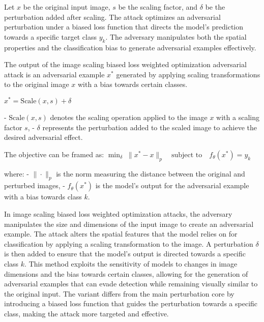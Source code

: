 Let \( x \) be the original input image, \( s \) be the scaling factor, and \( \delta \) be the perturbation added after scaling. The attack optimizes an adversarial perturbation under a biased loss function that directs the model's prediction towards a specific target class \( y_k \). The adversary manipulates both the spatial properties and the classification bias to generate adversarial examples effectively.

The output of the image scaling biased loss weighted optimization adversarial attack is an adversarial example $x^*$ generated by applying scaling transformations to the original image $x$ with a bias towards certain classes.

$x^* = \text{Scale}(x, s) + \delta$

- $\text{Scale}(x, s)$ denotes the scaling operation applied to the image $x$ with a scaling factor $s$,
- $\delta$ represents the perturbation added to the scaled image to achieve the desired adversarial effect.

The objective can be framed as:
$\min_{\delta} \; \|x^* - x\|_p \quad \text{subject to} \quad f_\theta(x^*) = y_k$

where:
- $\|\cdot\|_p$ is the norm measuring the distance between the original and perturbed images,
- $f_\theta(x^*)$ is the model's output for the adversarial example with a bias towards class $k$.

In image scaling biased loss weighted optimization attacks, the adversary manipulates the size and dimensions of the input image to create an adversarial example. The attack alters the spatial features that the model relies on for classification by applying a scaling transformation to the image. A perturbation $\delta$ is then added to ensure that the model's output is directed towards a specific class $k$. This method exploits the sensitivity of models to changes in image dimensions and the bias towards certain classes, allowing for the generation of adversarial examples that can evade detection while remaining visually similar to the original input. The variant differs from the main perturbation core by introducing a biased loss function that guides the perturbation towards a specific class, making the attack more targeted and effective.
